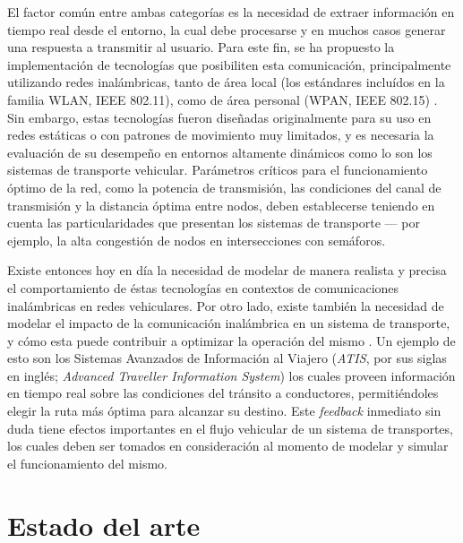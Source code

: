 El factor común entre ambas categorías es la necesidad de extraer información en tiempo real desde el entorno, la cual debe procesarse y en muchos casos generar una respuesta a transmitir al usuario. Para este fin, se ha propuesto la implementación de tecnologías que posibiliten esta comunicación, principalmente utilizando redes inalámbricas, tanto de área local (los estándares incluídos en la familia WLAN, IEEE 802.11), como de área personal (WPAN, IEEE 802.15) \autocite{80211dailey,80215vanet,80211wave}. Sin embargo, estas tecnologías fueron diseñadas originalmente para su uso en redes estáticas o con patrones de movimiento muy limitados, y es necesaria la evaluación de su desempeño en entornos altamente dinámicos como lo son los sistemas de transporte vehicular. Parámetros críticos para el funcionamiento óptimo de la red, como la potencia de transmisión, las condiciones del canal de transmisión y la distancia óptima entre nodos, deben establecerse teniendo en cuenta las particularidades que presentan los sistemas de transporte --- por ejemplo, la alta congestión de nodos en intersecciones con semáforos.

Existe entonces hoy en día la necesidad de modelar de manera realista y precisa el comportamiento de éstas tecnologías en contextos de comunicaciones inalámbricas en redes vehiculares. Por otro lado, existe también la necesidad de modelar el impacto de la comunicación inalámbrica en un sistema de transporte, y cómo esta puede contribuir a optimizar la operación del mismo \autocite{bidirectionalsimul}. Un ejemplo de esto son los Sistemas Avanzados de Información al Viajero (\textit{ATIS}, por sus siglas en inglés; \textit{Advanced Traveller Information System}) los cuales proveen información en tiempo real sobre las condiciones del tránsito a conductores, permitiéndoles elegir la ruta más óptima para alcanzar su destino. Este \textit{feedback} inmediato sin duda tiene efectos importantes en el flujo vehicular de un sistema de transportes, los cuales deben ser tomados en consideración al momento de modelar y simular el funcionamiento del mismo.


\section{Estado del arte}\label{sec:state_of_the_art}

